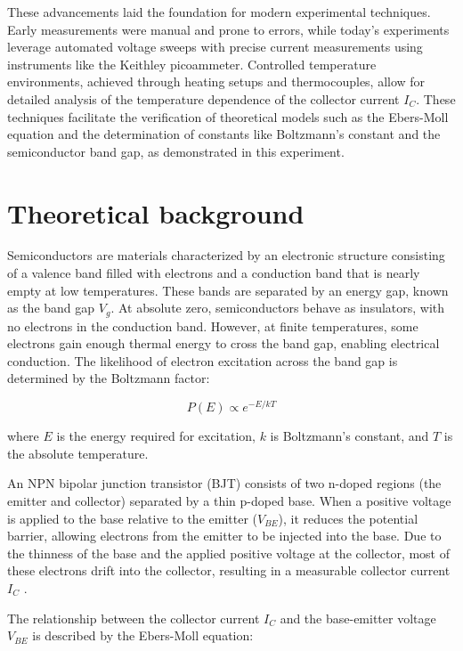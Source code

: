 \documentclass[12pt,letterpaper,twocolumn]{article}
\begin{document}
These advancements laid the foundation for modern experimental techniques. Early measurements were manual and prone to errors, while today’s experiments leverage automated voltage sweeps with precise current measurements using instruments like the Keithley picoammeter. Controlled temperature environments, achieved through heating setups and thermocouples, allow for detailed analysis of the temperature dependence of the collector current \(I_C\). These techniques facilitate the verification of theoretical models such as the Ebers-Moll equation and the determination of constants like Boltzmann's constant and the semiconductor band gap, as demonstrated in this experiment.



\section{Theoretical background}

Semiconductors are materials characterized by an electronic structure consisting of a valence band filled with electrons and a conduction band that is nearly empty at low temperatures. These bands are separated by an energy gap, known as the band gap \( V_g \). At absolute zero, semiconductors behave as insulators, with no electrons in the conduction band. However, at finite temperatures, some electrons gain enough thermal energy to cross the band gap, enabling electrical conduction. The likelihood of electron excitation across the band gap is determined by the Boltzmann factor:

\[
P(E) \propto e^{-E/kT}
\]

where \( E \) is the energy required for excitation, \( k \) is Boltzmann’s constant, and \( T \) is the absolute temperature\cite{Thornton}.

An NPN bipolar junction transistor (BJT) consists of two n-doped regions (the emitter and collector) separated by a thin p-doped base. When a positive voltage is applied to the base relative to the emitter (\( V_{BE} \)), it reduces the potential barrier, allowing electrons from the emitter to be injected into the base. Due to the thinness of the base and the applied positive voltage at the collector, most of these electrons drift into the collector, resulting in a measurable collector current \( I_C \) \cite{Neudeck}.

The relationship between the collector current \( I_C \) and the base-emitter voltage \( V_{BE} \) is described by the Ebers-Moll equation:
\end{document}
